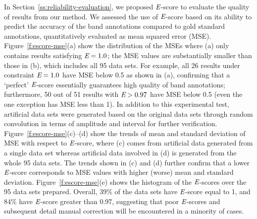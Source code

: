 In Section~\ref{ss:reliability-evaluation}, we proposed ${\emph{E}}$-score to evaluate the quality of results from our method. We assessed the use of ${\emph{E}}$-score based on its ability to predict the accuracy of the band annotations compared to gold standard annotations, quantitatively evaluated as mean squared error (MSE). Figure~\ref{f:escore-mse}(a) show the distribution of the MSEs where (a) only contains results satisfying ${\emph{E}} = 1.0$; the MSE values are substantially smaller than those in (b), which includes all 95 data sets.  For example, all 26 results under constraint ${\emph{E}}=1.0$ have MSE below 0.5 as shown in (a), confirming that a `perfect' ${\emph{E}}$-score essentially guarantees high quality of band annotations; furthermore, 50 out of 51 results with ${\emph{E}}>0.97$ have MSE below 0.5 (even the one exception has MSE less than 1). In addition to this experimental test, artificial data sets were generated based on the original data sets through random convolution in terms of amplitude and interval for further verification. Figure~\ref{f:escore-mse}(c)--(d) show the trends of mean and standard deviation of MSE with respect to ${\emph{E}}$-score, where (c) comes from artificial data generated from a single data set whereas artificial data involved in (d) is generated from the whole 95 data sets. The trends shown in (c) and (d) further confirm that a lower ${\emph{E}}$-score corresponds to MSE values with higher (worse) mean and standard deviation. Figure~\ref{f:escore-mse}(e) shows the histogram of the ${\emph{E}}$-scores over the 95 data sets prepared. Overall, 39\%  of the data sets have ${\emph{E}}$-score equal to 1, and 84\%  have ${\emph{E}}$-score greater than 0.97, suggesting that poor ${\emph{E}}$-scores and subsequent detail manual correction will be encountered in a minority of cases.

